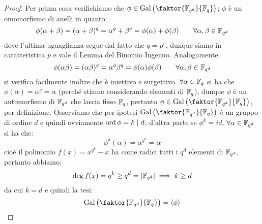 \documentclass[11pt]{scrartcl}
\begin{document}
\begin{proof}
    Per prima cosa verifichiamo che $\phi \in \Gal\left(\faktor{\F{q^d}}{\F{q}}\right)$; $\phi$ è un omomorfismo di anelli in quanto:
    \[ \phi(\alpha+\beta) = (\alpha+\beta)^q = \alpha^q + \beta^q = \phi(\alpha) + \phi(\beta) \qquad \forall \alpha,\beta \in \mathbb{F}_{q^d} 
        \]
    dove l'ultima uguaglianza segue dal fatto che $q = p^r$, dunque siamo in caratteristica $p$ e vale il Lemma del Binomio Ingenuo. Analogamente:
    \[ \phi(\alpha\beta) = (\alpha\beta)^q = \alpha^q \beta^q = \phi(\alpha)\phi(\beta) \qquad \forall \alpha,\beta \in \mathbb{F}_{q^d} 
        \]
    si verifica facilmente inoltre che è iniettivo e surgettivo. $\forall \alpha \in \mathbb{F}_{q}$ si ha che $\phi(\alpha) = \alpha^q = \alpha$ (perché stiamo considerando elementi di $\mathbb{F}_{q}$), dunque $\phi$ è un automorfismo di $\mathbb{F}_{q^d}$ che lascia fisso $\mathbb{F}_{q}$, pertanto
    $\phi \in \Gal\left(\faktor{\F{q^d}}{\F{q}}\right)$, per definizione. Osserviamo che per ipotesi $\Gal\left(\faktor{\F{q^d}}{\F{q}}\right)$ è un gruppo di ordine $d$ e quindi 
    ovviamente $\operatorname{ord} \phi = k \mid d$; d'altra parte se $\phi^k = id$, $\forall \alpha \in \mathbb{F}_{q^d}$ si ha che:
    \[ \phi^k(\alpha) = \alpha^{q^k} = \alpha
        \]
    cioè il polinomio $f(x) = x^{q^k} - x$ ha come radici tutti i $q^d$ elementi di $\mathbb{F}_{q^d}$, pertanto abbiamo:
    \[ \deg f(x) = q^k \geq q^d = |\mathbb{F}_{q^d}|\implies k \geq d
        \]
    da cui $k = d$ e quindi la tesi:
    \[ \Gal\left(\faktor{\F{q^d}}{\F{q}}\right) = \left<\phi\right>
        \]
\end{proof}
\end{document}
